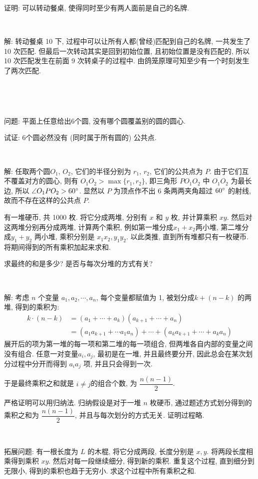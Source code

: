 证明: 可以转动餐桌, 使得同时至少有两人面前是自己的名牌.

~

解: 转动餐桌 10 下, 过程中可以让所有人都(曾经)匹配到自己的名牌, 一共发生了 10 次匹配. 但最后一次转动其实是回到初始位置, 且初始位置是没有匹配的, 所以 10 次匹配发生在前面 9 次转桌子的过程中. 由鸽笼原理可知至少有一个时刻发生了两次匹配.

~

~

问题: 平面上任意给出6个圆, 没有哪个圆覆盖别的圆的圆心.

试证: 6个圆必然没有 (同时属于所有圆的) 公共点.​​​

~

解: 任取两个圆$O_1$, $O_2$, 它们的半径分别为 $r_1$, $r_2$, 它们的公共点为 $P$. 
由于它们互不覆盖对方的圆心, 则有 $O_1O_2 > \max\{r_1, r_2\}$, 即三角形 $PO_1O_2$ 中 $O_1O_2$ 为最长边, 所以 $\angle O_1PO_2 > 60\degree$. 显然以 $P$ 为顶点作不出 6 条两两夹角超过 $60\degree$ 的射线, 故而不存在这样的公共点 $P$.


\newpage
有一堆硬币, 共 1000 枚. 将它分成两堆, 分别有 $x$ 和 $y$ 枚, 并计算乘积 $xy$. 然后对这两堆分别再分成两堆, 计算两个乘积, 例如第一堆分成$x_1+x_2$两小堆, 第二堆分成$y_1+y_2$ 两小堆, 乘积分别是 $x_1x_2, y_1y_2$. 以此类推, 直到所有堆都只有一枚硬币. 将期间得到的所有乘积加起来求和. 

求最终的和是多少? 是否与每次分堆的方式有关?

~

解: 考虑 $n$ 个变量 $a_1, a_2, \cdots, a_n$, 每个变量都赋值为 1, 被划分成$k+(n-k)$ 的两堆, 得到的乘积为:
\begin{align*}
k\cdot(n-k) &=(a_1+\cdots+a_k)(a_{k+1}+\cdots+a_n) \\
& = (a_1a_{k+1}+\cdots a_1a_n)+\cdots+(a_ka_{k+1}+\cdots+a_ka_n)
\end{align*}
展开后的项为第一堆的每一项和第二堆的每一项组合, 但两堆各自内部的变量之间没有组合. 任意一对变量$a_i, a_j$, 最初是在一堆, 并且最终要分开, 因此总会在某次划分过程中分开而得到 $a_ia_j$ 项, 并且只会得到一次.

于是最终乘积之和就是 $i\neq j$的组合个数, 为 $\dfrac{n(n-1)}{2}$. 

严格证明可以用归纳法. 归纳假设是对于一堆 $n$ 枚硬币, 通过题述方式划分得到的乘积之和为 $\dfrac{n(n-1)}{2}$, 并且与每次划分的方式无关. 证明过程略.

~

拓展问题: 有一根长度为 $L$ 的木棍, 将它分成两段, 长度分别是 $x,y$. 将两段长度相乘得到乘积 $xy$. 然后对每一段继续细分, 得到新的乘积. 重复这个过程, 直到细分到无限小, 得到的乘积也趋于无穷小. 求这个过程中所有乘积之和.

